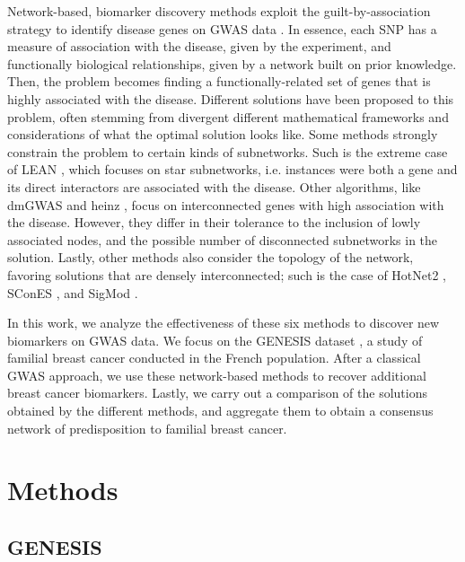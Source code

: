 \documentclass[twocolumn, 10pt]{article}
\begin{document}
Network-based, biomarker discovery methods exploit the guilt-by-association strategy to identify disease genes on GWAS data \cite{azencott_network-guided_2016}. In essence, each SNP has a measure of association with the disease, given by the experiment, and functionally biological relationships, given by a network built on prior knowledge. Then, the problem becomes finding a functionally-related set of genes that is highly associated with the disease. Different solutions have been proposed to this problem, often stemming from divergent different mathematical frameworks and considerations of what the optimal solution looks like. Some methods strongly constrain the problem to certain kinds of subnetworks. Such is the extreme case of LEAN \cite{gwinner_network-based_2016}, which focuses on star subnetworks, i.e. instances were both a gene and its direct interactors are associated with the disease. Other algorithms, like dmGWAS \cite{jia_dmgwas:_2011} and heinz \cite{dittrich_identifying_2008}, focus on interconnected genes with high association with the disease. However, they differ in their tolerance to the inclusion of lowly associated nodes, and the possible number of disconnected subnetworks in the solution. Lastly, other methods also consider the topology of the network, favoring solutions that are densely interconnected; such is the case of HotNet2 \cite{leiserson_pan-cancer_2015}, SConES \cite{azencott_efficient_2013}, and SigMod \cite{liu_sigmod:_2017}.

In this work, we analyze the effectiveness of these six methods to discover new biomarkers on GWAS data. We focus on the GENESIS dataset \cite{sinilnikova_genesis:_2016}, a study of familial breast cancer conducted in the French population. After a classical GWAS approach, we use these network-based methods to recover additional breast cancer biomarkers. Lastly, we carry out a comparison of the solutions obtained by the different methods, and aggregate them to obtain a consensus network of predisposition to familial breast cancer. 

\section{Methods}
\subsection{GENESIS}
\end{document}

